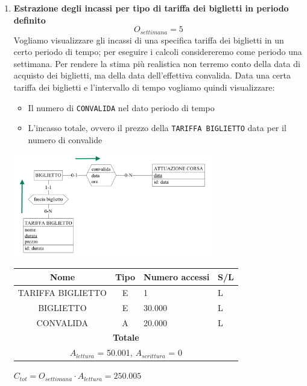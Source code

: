 \documentclass[12pt,a4paper]{report}
\begin{document}
\begin{enumerate}[label=\textbf{\arabic*}]
    \item\textbf{Estrazione degli incassi per tipo di tariffa dei biglietti in periodo definito} \label{op10} \\
    \[ {O_{settimana} = 5} \]
    Vogliamo visualizzare gli incassi di una specifica tariffa dei biglietti in un certo periodo di tempo; per eseguire i calcoli considereremo come periodo una settimana. Per rendere la stima più realistica non terremo conto della data di acquisto dei biglietti, ma della data dell'effettiva convalida.
    Data una certa tariffa dei biglietti e l'intervallo di tempo vogliamo quindi visualizzare:
    \begin{itemize}
	\renewcommand\labelitemi{--}
    \item Il numero di \texttt{CONVALIDA} nel dato periodo di tempo
    \item L'incasso totale, ovvero il prezzo della \texttt{TARIFFA BIGLIETTO} data per il numero di convalide
    \end{itemize}
    \begin{center}
    \includegraphics[width=0.7\textwidth]{VisualIncassoPerTariffa}
    \end{center}
    \begin{table}[H]
    \centering
    \begin{tabular}{|c|c|l|l|}
    \hline
    \textbf{Nome} & \textbf{Tipo} & \textbf{Numero accessi} & \textbf{S/L} \\
    \hline
    TARIFFA BIGLIETTO & E & 1 & L \\
    \hline
    BIGLIETTO & E & 30.000 & L \\
    \hline
    CONVALIDA & A & 20.000 & L \\
    \hline
    \multicolumn{4}{c}{\textbf{Totale}} \\
    \multicolumn{4}{c}{${A_{lettura}}$ = 50.001, ${A_{scrittura}}$ = 0} \\
    \hline
    \end{tabular}
    \end{table}
    \begin{center}
    ${C_{tot} = {O_{settimana}}\cdot{A_{lettura}}= 250.005}$
    \end{center}


\end{enumerate}
\end{document}
